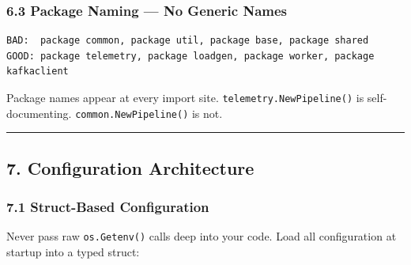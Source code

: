 \documentclass[11pt,openany]{book}
\begin{document}
\hypertarget{package-naming-no-generic-names}{%
\subsubsection{6.3 Package Naming --- No Generic
Names}\label{package-naming-no-generic-names}}

\begin{verbatim}
BAD:  package common, package util, package base, package shared
GOOD: package telemetry, package loadgen, package worker, package kafkaclient
\end{verbatim}

Package names appear at every import site.
\texttt{telemetry.NewPipeline()} is self-documenting.
\texttt{common.NewPipeline()} is not.

\begin{center}\rule{0.5\linewidth}{0.5pt}\end{center}

\hypertarget{configuration-architecture}{%
\subsection{7. Configuration
Architecture}\label{configuration-architecture}}

\hypertarget{struct-based-configuration}{%
\subsubsection{7.1 Struct-Based
Configuration}\label{struct-based-configuration}}

Never pass raw \texttt{os.Getenv()} calls deep into your code. Load all
configuration at startup into a typed struct:
\end{document}
